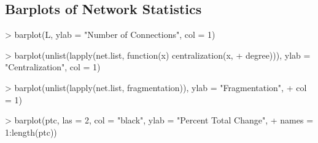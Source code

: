 \documentclass[11pt]{amsart}
\begin{document}









\subsection*{Barplots of Network Statistics}

\begin{Schunk}
\begin{Sinput}
> barplot(L, ylab = "Number of Connections", col = 1)
\end{Sinput}
\end{Schunk}

\begin{Schunk}
\begin{Sinput}
> barplot(unlist(lapply(net.list, function(x) centralization(x, 
+     degree))), ylab = "Centralization", col = 1)
\end{Sinput}
\end{Schunk}

\begin{Schunk}
\begin{Sinput}
> barplot(unlist(lapply(net.list, fragmentation)), ylab = "Fragmentation", 
+     col = 1)
\end{Sinput}
\end{Schunk}


\begin{Schunk}
\begin{Sinput}
> barplot(ptc, las = 2, col = "black", ylab = "Percent Total Change", 
+     names = 1:length(ptc))
\end{Sinput}
\end{Schunk}
\end{document}
